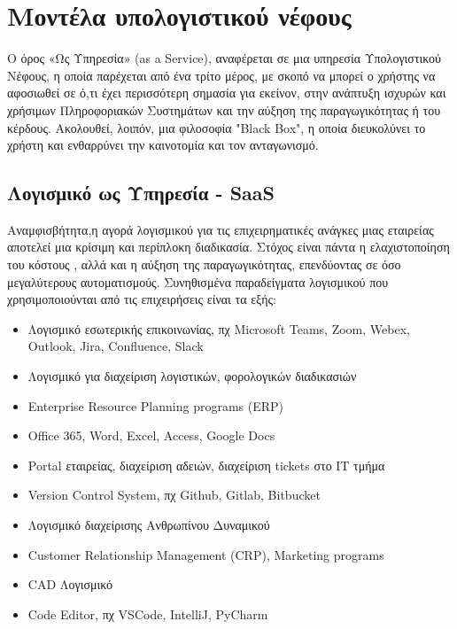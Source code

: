 \documentclass{article}
\begin{document}
\section{Μοντέλα υπολογιστικού νέφους}
Ο όρος «Ως Υπηρεσία» (as a Service), αναφέρεται σε μια υπηρεσία Υπολογιστικού Νέφους, η οποία παρέχεται από ένα τρίτο μέρος, με σκοπό να μπορεί ο χρήστης να αφοσιωθεί σε ό,τι έχει περισσότερη σημασία για εκείνον, στην ανάπτυξη ισχυρών και χρήσιμων Πληροφοριακών Συστημάτων και την αύξηση της παραγωγικότητας ή του κέρδους. Ακολουθεί, λοιπόν, μια φιλοσοφία "Black Box", η οποία διευκολύνει το χρήστη και ενθαρρύνει την καινοτομία και τον ανταγωνισμό.

\subsection{Λογισμικό ως Υπηρεσία - SaaS}
Αναμφισβήτητα,η αγορά λογισμικού για τις επιχειρηματικές ανάγκες μιας εταιρείας αποτελεί μια κρίσιμη και περίπλοκη διαδικασία. Στόχος είναι πάντα η ελαχιστοποίηση του κόστους , αλλά και η αύξηση της παραγωγικότητας, επενδύοντας σε όσο μεγαλύτερους αυτοματισμούς. Συνηθισμένα παραδείγματα λογισμικού που χρησιμοποιούνται από τις επιχειρήσεις είναι τα εξής:
\begin{itemize}
  \item Λογισμικό εσωτερικής επικοινωνίας, πχ  Microsoft Teams, Zoom, Webex, Outlook, Jira, Confluence, Slack
  \item Λογισμικό για διαχείριση λογιστικών, φορολογικών διαδικασιών
  \item {} Enterprise Resource Planning programs (ERP)
  \item Office 365, Word, Excel, Access, Google Docs
  \item Portal  εταιρείας, διαχείριση αδειών, διαχείριση tickets στο ΙΤ τμήμα 
  \item Version Control System, πχ Github, Gitlab, Bitbucket 
  \item Λογισμικό διαχείρισης Ανθρωπίνου Δυναμικού 
  \item Customer Relationship Management (CRP), Marketing programs
  \item CAD Λογισμικό
  \item Code Editor, πχ VSCode, IntelliJ, PyCharm
\end{itemize}
\end{document}
